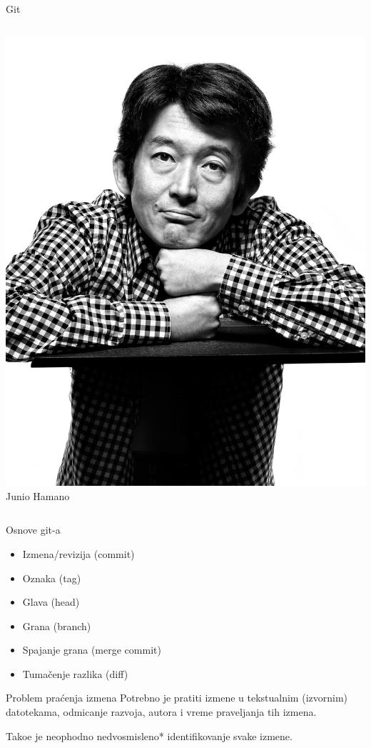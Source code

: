 \documentclass{beamer}
\begin{document}
\begin{frame}{Git}
\begin{columns}
\begin{center}
				\includegraphics[scale=0.08]{hamano.jpg}\\
				Junio Hamano
			\end{center}
	\end{columns}
\end{frame}

\begin{frame}{Osnove git-a}
	\begin{itemize}
		\item Izmena/revizija (commit)
		\pause
		\item Oznaka (tag)
		\pause
		\item Glava (head)
		\pause
		\item Grana (branch)
		\pause
		\item Spajanje grana (merge commit)
		\pause
		\item Tuma\v cenje razlika (diff)
	\end{itemize}
\end{frame}

\begin{frame}{Problem pra\' cenja izmena}
	Potrebno je pratiti izmene u tekstualnim (izvornim) datotekama,
	odmicanje razvoja, autora i vreme praveljanja tih izmena.

	\bigskip

	Tako\dj e je neophodno nedvosmisleno* identifikovanje svake izmene.
\end{frame}
\end{document}
